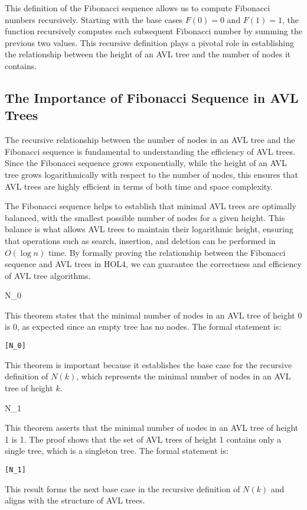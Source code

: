     This definition of the Fibonacci sequence allows us to compute Fibonacci numbers recursively. Starting with the base cases \( F(0) = 0 \) and \( F(1) = 1 \), the function recursively computes each subsequent Fibonacci number by summing the previous two values. This recursive definition plays a pivotal role in establishing the relationship between the height of an AVL tree and the number of nodes it contains.


\subsection{The Importance of Fibonacci Sequence in AVL Trees}

    The recursive relationship between the number of nodes in an AVL tree and the Fibonacci sequence is fundamental to understanding the efficiency of AVL trees. Since the Fibonacci sequence grows exponentially, while the height of an AVL tree grows logarithmically with respect to the number of nodes, this ensures that AVL trees are highly efficient in terms of both time and space complexity.

    The Fibonacci sequence helps to establish that minimal AVL trees are optimally balanced, with the smallest possible number of nodes for a given height. This balance is what allows AVL trees to maintain their logarithmic height, ensuring that operations such as search, insertion, and deletion can be performed in \( O(\log n) \) time. By formally proving the relationship between the Fibonacci sequence and AVL trees in HOL4, we can guarantee the correctness and efficiency of AVL tree algorithms.

    \begin{thm}{N\_0}

    This theorem states that the minimal number of nodes in an AVL tree of height 0 is 0, as expected since an empty tree has no nodes. The formal statement is:
    \begin{alltt}
    	[N_0]
    	\HOLTokenTurnstile{}   \HOLSymConst{=} 
    \end{alltt}
    
    \end{thm}
    This theorem is important because it establishes the base case for the recursive definition of \( N(k) \), which represents the minimal number of nodes in an AVL tree of height \( k \).


    \begin{thm}{N\_1}

    This theorem asserts that the minimal number of nodes in an AVL tree of height 1 is 1. The proof shows that the set of AVL trees of height 1 contains only a single tree, which is a singleton tree. The formal statement is:
    \begin{alltt}
    	[N_1]
    	\HOLTokenTurnstile{}   \HOLSymConst{=} 
    \end{alltt}
    
    \end{thm}
    This result forms the next base case in the recursive definition of \( N(k) \) and aligns with the structure of AVL trees.



